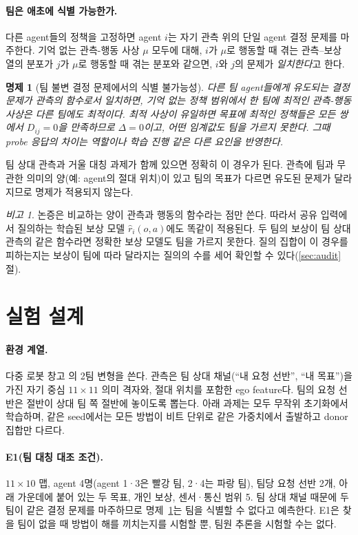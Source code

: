 \documentclass[twocolumn,10pt]{article}
\newtheorem{proposition}{명제}
\theoremstyle{remark}
\newtheorem{remark}{비고}
\begin{document}
\paragraph{팀은 애초에 식별 가능한가.} 다른 agent들의 정책을 고정하면 agent $i$는 자기 관측 위의 단일 agent 결정 문제를
마주한다. 기억 없는 관측-행동 사상 $\mu$ 모두에 대해, $i$가 $\mu$로 행동할 때 겪는 관측--보상 열의 분포가 $j$가 $\mu$로 행동할
때 겪는 분포와 같으면, $i$와 $j$의 문제가 \emph{일치한다}고 한다.
\begin{proposition}[팀 불변 결정 문제에서의 식별 불가능성]
\label{prop:nonid}
다른 팀 agent들에게 유도되는 결정 문제가 관측의 함수로서 일치하면, 기억 없는 정책 범위에서 한 팀에 최적인 관측-행동 사상은
다른 팀에도 최적이다. 최적 사상이 유일하면 목표에 최적인 정책들은 모든 쌍에서 $D_{ij}=0$을 만족하므로 $\Delta=0$이고, 어떤
임계값도 팀을 가르지 못한다. 그때 probe 응답의 차이는 역할이나 학습 진행 같은 다른 요인을 반영한다.
\end{proposition}
팀 상대 관측과 거울 대칭 과제가 함께 있으면 정확히 이 경우가 된다. 관측에 팀과 무관한 의미의 양(예: agent의 절대 위치)이 있고
팀의 목표가 다르면 유도된 문제가 달라지므로 명제가 적용되지 않는다.
\begin{remark}
\label{rem:reward}
논증은 비교하는 양이 관측과 행동의 함수라는 점만 쓴다. 따라서 공유 입력에서 질의하는 학습된 보상 모델 $\hat r_i(o,a)$에도 똑같이
적용된다. 두 팀의 보상이 팀 상대 관측의 같은 함수라면 정확한 보상 모델도 팀을 가르지 못한다. 질의 집합이 이 경우를 피하는지는
보상이 팀에 따라 달라지는 질의의 수를 세어 확인할 수 있다(\ref{sec:audit}절).
\end{remark}

\section{실험 설계}
\label{sec:setup}
\paragraph{환경 계열.} 다중 로봇 창고 \cite{papoudakis2021benchmarking}의 2팀 변형을 쓴다. 관측은 팀 상대 채널(``내 요청
선반'', ``내 목표'')을 가진 자기 중심 $11\times11$ 의미 격자와, 절대 위치를 포함한 ego feature다. 팀의 요청 선반은 절반이 상대
팀 쪽 절반에 놓이도록 뽑는다. 아래 과제는 모두 무작위 초기화에서 학습하며, 같은 seed에서는 모든 방법이 비트 단위로 같은
가중치에서 출발하고 donor 집합만 다르다.

\paragraph{E1(팀 대칭 대조 조건).} $11\times10$ 맵, agent 4명(agent 1·3은 빨강 팀, 2·4는 파랑 팀), 팀당 요청 선반 2개, 아래
가운데에 붙어 있는 두 목표, 개인 보상, 센서·통신 범위 5. 팀 상대 채널 때문에 두 팀이 같은 결정 문제를 마주하므로
명제~\ref{prop:nonid}는 팀을 식별할 수 없다고 예측한다. E1은 찾을 팀이 없을 때 방법이 해를 끼치는지를 시험할 뿐, 팀원 추론을
시험할 수는 없다.
\end{document}
